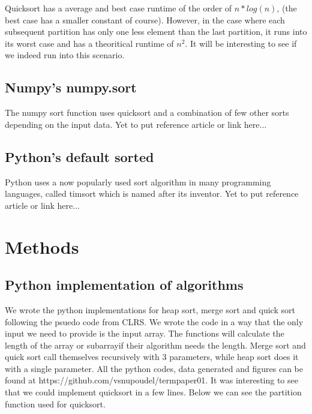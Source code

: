\documentclass[sigconf,  natbib, screen]{acmart}
\begin{document}
 Quicksort has a average and best case runtime of the order of $n*log(n)$, (the best case has a smaller constant of course).
 However, in the case where each subsequent partition has only one less element than the last partition, it runs
into its worst case and has a theoritical runtime of $n^2$. It will be interesting to see if we indeed run into this scenario.

\subsection{Numpy's numpy.sort}\label{sec:numpy sort}
The numpy sort function uses quicksort and a combination of few other sorts depending on the input data. Yet to 
put reference article or link here...

\subsection{Python's default sorted}\label{sec:sorted sort}
Python uses a now popularly used sort algorithm in many programming languages, called timsort which is named after its
inventor. Yet to put reference article or link here...

\section{Methods}\label{sec:methods}

\subsection{Python implementation of algorithms}\label{sec:python implementation}

We wrote the python implementations for heap sort, merge sort and quick sort following the psuedo code from CLRS. We wrote
the code in a way that the only input we need to provide is the input array. The functions will calculate the length of the array 
or subarrayif their algorithm needs the length. Merge sort and quick sort call themselves recursively with 3 parameters, while heap
sort does it with a single parameter. All the python codes, data generated and figures can be found at https://github.com/vsnupoudel/termpaper01.
It was interesting to see that we could implement quicksort in a few lines. Below we can see the partition function used for quicksort.
\end{document}
